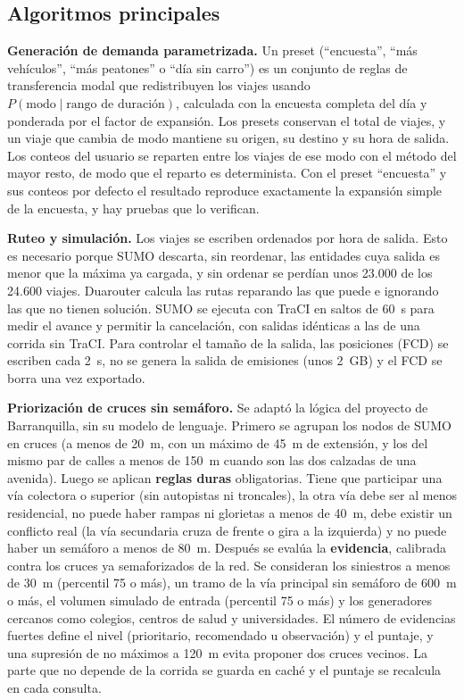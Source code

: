 \subsection{Algoritmos principales}

\textbf{Generación de demanda parametrizada.} Un preset (“encuesta”, “más vehículos”, “más peatones” o “día sin carro”) es un conjunto de reglas de transferencia modal que redistribuyen los viajes usando $P(\text{modo}\mid\text{rango de duración})$, calculada con la encuesta completa del día y ponderada por el factor de expansión. Los presets conservan el total de viajes, y un viaje que cambia de modo mantiene su origen, su destino y su hora de salida. Los conteos del usuario se reparten entre los viajes de ese modo con el método del mayor resto, de modo que el reparto es determinista. Con el preset “encuesta” y sus conteos por defecto el resultado reproduce exactamente la expansión simple de la encuesta, y hay pruebas que lo verifican.

\textbf{Ruteo y simulación.} Los viajes se escriben ordenados por hora de salida. Esto es necesario porque SUMO descarta, sin reordenar, las entidades cuya salida es menor que la máxima ya cargada, y sin ordenar se perdían unos 23.000 de los 24.600 viajes. Duarouter calcula las rutas reparando las que puede e ignorando las que no tienen solución. SUMO se ejecuta con TraCI en saltos de 60~s para medir el avance y permitir la cancelación, con salidas idénticas a las de una corrida sin TraCI. Para controlar el tamaño de la salida, las posiciones (FCD) se escriben cada 2~s, no se genera la salida de emisiones (unos 2~GB) y el FCD se borra una vez exportado.

\textbf{Priorización de cruces sin semáforo.} Se adaptó la lógica del proyecto de Barranquilla, sin su modelo de lenguaje. Primero se agrupan los nodos de SUMO en cruces (a menos de 20~m, con un máximo de 45~m de extensión, y los del mismo par de calles a menos de 150~m cuando son las dos calzadas de una avenida). Luego se aplican \textbf{reglas duras} obligatorias. Tiene que participar una vía colectora o superior (sin autopistas ni troncales), la otra vía debe ser al menos residencial, no puede haber rampas ni glorietas a menos de 40~m, debe existir un conflicto real (la vía secundaria cruza de frente o gira a la izquierda) y no puede haber un semáforo a menos de 80~m. Después se evalúa la \textbf{evidencia}, calibrada contra los cruces ya semaforizados de la red. Se consideran los siniestros a menos de 30~m (percentil 75 o más), un tramo de la vía principal sin semáforo de 600~m o más, el volumen simulado de entrada (percentil 75 o más) y los generadores cercanos como colegios, centros de salud y universidades. El número de evidencias fuertes define el nivel (prioritario, recomendado u observación) y el puntaje, y una supresión de no máximos a 120~m evita proponer dos cruces vecinos. La parte que no depende de la corrida se guarda en caché y el puntaje se recalcula en cada consulta.

